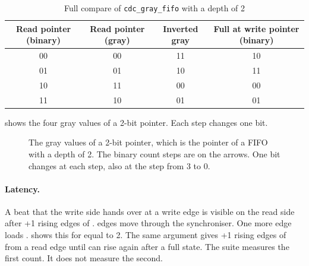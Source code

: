 \begin{table}[ht]
  \centering
  \caption{Full compare of \texttt{cdc\_gray\_fifo} with a depth of 2}\label{tab:tm:mod:cdc-gray-fifo:d2full}
  \begin{tabular}{@{}cccc@{}}
    \toprule
    Read pointer (binary) & Read pointer (gray) & Inverted gray & Full at write pointer (binary)\\
    \midrule
    00 & 00 & 11 & 10\\
    01 & 01 & 10 & 11\\
    10 & 11 & 00 & 00\\
    11 & 10 & 01 & 01\\
    \bottomrule
  \end{tabular}
\end{table}

 shows the four gray values of a 2-bit pointer. Each step changes one bit.

\begin{figure}[ht]
  \centering
  \caption{The gray values of a 2-bit pointer, which is the pointer of a FIFO with a depth of 2. The binary count steps are on the arrows. One bit changes at each step, also at the step from 3 to 0.}\label{fig:tm:mod:cdc-gray-fifo:ring}
\end{figure}

\paragraph{Latency.} A beat that the write side hands over at a write edge is visible on the read side after +1 rising edges of .  edges move  through the synchroniser. One more edge loads .  shows this for  equal to 2. The same argument gives +1 rising edges of  from a read edge until  can rise again after a full state. The suite measures the first count. It does not measure the second.

